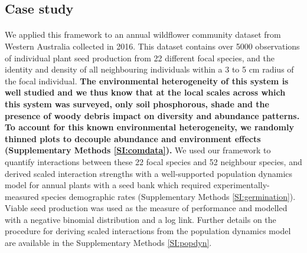 \documentclass[a4,12pt]{article}
\begin{document}
\begin{refsection}
    \subsection{Case study}

       \paragraph{}
        We applied this framework to an annual wildflower community dataset from Western Australia collected in 2016. This dataset contains over 5000 observations of individual plant seed production from 22 different focal species, and the identity and density of all neighbouring individuals within a 3 to 5 cm radius of the focal individual. \textbf{The environmental heterogeneity of this system is well studied \parencite{Dwyer2015} and we thus know that at the local scales across which this system was surveyed, only soil phosphorous, shade and the presence of woody debris impact on diversity and abundance patterns. To account for this known environmental heterogeneity, we randomly thinned plots to decouple abundance and environment effects (Supplementary Methods \ref{SI:comdata}).} We used our framework to quantify interactions between these 22 focal species and 52 neighbour species, and derived scaled interaction strengths with a well-supported population dynamics model for annual plants with a seed bank \parencite{Levine2009, Bimler2018} which required experimentally-measured species demographic rates (Supplementary Methods \ref{SI:germination}). Viable seed production was used as the measure of performance and modelled with a negative binomial distribution and a log link. Further details on the procedure for deriving scaled interactions from the population dynamics model are available in the Supplementary Methods \ref{SI:popdyn}.


\end{refsection}
\end{document}
